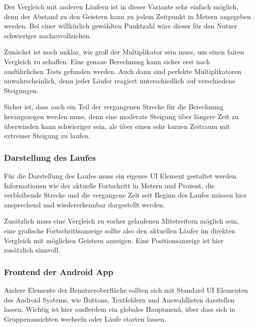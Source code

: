 Der Vergleich mit anderen Läufern ist in dieser Variante sehr einfach möglich, denn der Abstand zu den Geistern kann zu jedem Zeitpunkt in Metern angegeben werden. Bei einer willkürlich gewählten Punktzahl wäre dieser für den Nutzer schwieriger nachzuvollziehen.

Zunächst ist noch unklar, wie groß der Multiplikator sein muss, um einen fairen Vergleich zu schaffen. Eine genaue Berechnung kann sicher erst nach ausführlichen Tests gefunden werden. Auch dann sind perfekte Multiplikatoren unwahrscheinlich, denn jeder Läufer reagiert unterschiedlich auf verschiedene Steigungen.

Sicher ist, dass auch ein Teil der vergangenen Strecke für die Berechnung herangezogen werden muss, denn eine moderate Steigung über längere Zeit zu überwinden kann schwieriger sein, als über einen sehr kurzen Zeitraum mit extremer Steigung zu laufen.
\subsubsection{Darstellung des Laufes}
Für die Darstellung des Laufes muss ein eigenes UI Element gestaltet werden. Informationen wie der aktuelle Fortschritt in Metern und Prozent, die verbleibende Strecke und die vergangene Zeit seit Beginn des Laufes müssen hier ansprechend und wiedererkennbar dargestellt werden.

Zusätzlich muss eine Vergleich zu vorher gelaufenen Mitstreitern möglich sein, eine grafische Fortschrittsanzeige sollte also den aktuellen Läufer im direkten Vergleich mit möglichen Geistern anzeigen. Eine Positionsanzeige ist hier zusätzlich sinnvoll.
\subsubsection{Frontend der Android App}
Andere Elemente der Benutzeroberfläche sollten sich mit Standard UI Elementen des Android Systems, wie Buttons, Textfeldern und Auswahllisten darstellen lassen. Wichtig ist hier ausßerdem ein globales Hauptmenü, über dass sich in Gruppenansichten wechseln oder Läufe starten lassen.